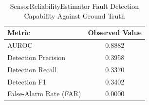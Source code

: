 \begin{table}[htbp]
\caption{SensorReliabilityEstimator Fault Detection Capability Against Ground Truth}
\label{tab:rel_detection}
\centering
\begin{tabular}{lc}
\hline
Metric & Observed Value \\ \hline
AUROC & 0.8882 \\
Detection Precision & 0.3958 \\
Detection Recall & 0.3370 \\
Detection F1 & 0.3402 \\
False-Alarm Rate (FAR) & 0.0000 \\
\hline
\end{tabular}
\end{table}
